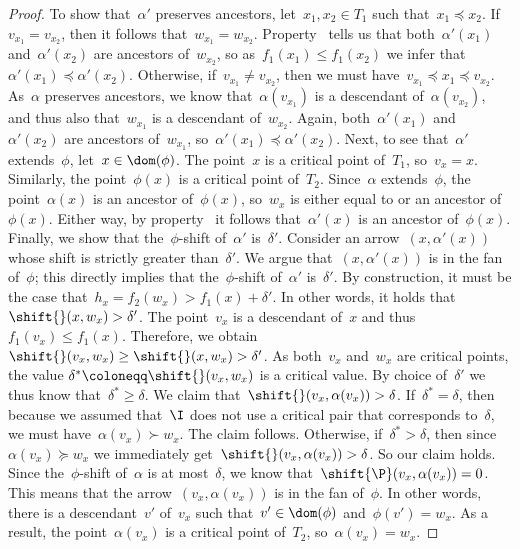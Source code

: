 \begin{proof}
To show that~$\alpha'$ preserves ancestors, let~$x_1, x_2 \in T_1$ such that~$x_1 \preceq x_2$.
If~$v_{x_1} = v_{x_2}$, then it follows that~$w_{x_1} = w_{x_2}$.
Property~ tells us that both~$\alpha'(x_1)$ and~$\alpha'(x_2)$ are ancestors of~$w_{x_2}$, so as~$f_1(x_1) \le f_1(x_2)$ we infer that~$\alpha'(x_1) \preceq \alpha'(x_2)$.
Otherwise, if~$v_{x_1} \neq v_{x_2}$, then we must have~$v_{x_1} \preceq x_1 \preceq v_{x_2}$.
As~$\alpha$ preserves ancestors, we know that~$\alpha(v_{x_1})$ is a descendant of~$\alpha(v_{x_2})$, and thus also that~$w_{x_1}$ is a descendant of~$w_{x_2}$.
Again, both~$\alpha'(x_1)$ and~$\alpha'(x_2)$ are ancestors of~$w_{x_1}$, so~$\alpha'(x_1) \preceq \alpha'(x_2)$.
%
Next, to see that~$\alpha'$ extends~$\phi$, let~$x \in \dom(\phi)$.
The point~$x$ is a critical point of~$T_1$, so~$v_x = x$.
Similarly, the point~$\phi(x)$ is a critical point of~$T_2$.
Since~$\alpha$ extends~$\phi$, the point~$\alpha(x)$ is an ancestor of~$\phi(x)$, so~$w_x$ is either equal to or an ancestor of~$\phi(x)$.
Either way, by property~ it follows that~$\alpha'(x)$ is an ancestor of~$\phi(x)$.
%
Finally, we show that the~$\phi$-shift of~$\alpha'$ is~$\delta'$.
Consider an arrow~$(x, \alpha'(x))$ whose shift is strictly greater than~$\delta'$.
We argue that~$(x, \alpha'(x))$ is in the fan of~$\phi$; this directly implies that the~$\phi$-shift of~$\alpha'$ is~$\delta'$.
By construction, it must be the case that~$h_x = f_2(w_x) > f_1(x) + \delta'$.
In other words, it holds that~$\shift{}(x, w_x) > \delta'$.
The point~$v_x$ is a descendant of~$x$ and thus~$f_1(v_x) \le f_1(x)$.
Therefore, we obtain~$\shift{}(v_x, w_x) \ge \shift{}(x, w_x) > \delta'$.
As both~$v_x$ and~$w_x$ are critical points, the value $\delta^* \coloneqq \shift{}(v_x, w_x)$ is a critical value.
By choice of~$\delta'$ we thus know that~$\delta^* \ge \delta$.
We claim that~$\shift{}(v_x, \alpha(v_x)) > \delta$.
If~$\delta^* = \delta$, then because we assumed that~$\I$ does not use a critical pair that corresponds to~$\delta$, we must have~$\alpha(v_x) \succ w_x$.
The claim follows.
Otherwise, if~$\delta^* > \delta$, then since~$\alpha(v_x) \succeq w_x$ we immediately get~$\shift{}(v_x, \alpha(v_x)) > \delta$.
So our claim holds.
%
Since the~$\phi$-shift of~$\alpha$ is at most~$\delta$, we know that~$\shift{\P}(v_x, \alpha(v_x)) = 0$.
This means that the arrow~$(v_x, \alpha(v_x))$ is in the fan of~$\phi$.
In other words, there is a descendant~$v'$ of~$v_x$ such that~$v' \in \dom(\phi)$ and~$\phi(v') = w_x$.
As a result, the point~$\alpha(v_x)$ is a critical point of~$T_2$, so~$\alpha(v_x) = w_x$.

\end{proof}
